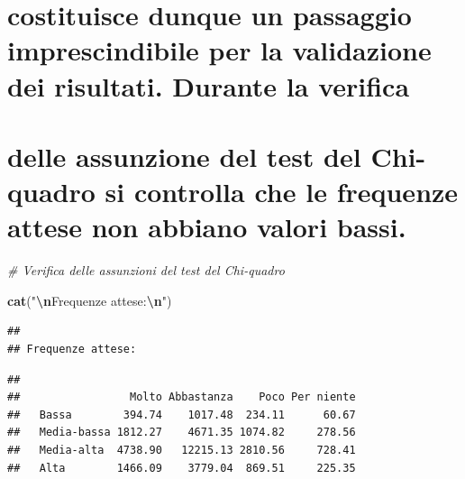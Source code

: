 \documentclass[
]{article}
\newenvironment{Shaded}{\begin{snugshade}}{\end{snugshade}}
\newcommand{\CommentTok}[1]{\textcolor[rgb]{0.56,0.35,0.01}{\textit{#1}}}
\newcommand{\DecValTok}[1]{\textcolor[rgb]{0.00,0.00,0.81}{#1}}
\newcommand{\FunctionTok}[1]{\textcolor[rgb]{0.13,0.29,0.53}{\textbf{#1}}}
\newcommand{\NormalTok}[1]{#1}
\newcommand{\OtherTok}[1]{\textcolor[rgb]{0.56,0.35,0.01}{#1}}
\newcommand{\SpecialCharTok}[1]{\textcolor[rgb]{0.81,0.36,0.00}{\textbf{#1}}}
\newcommand{\StringTok}[1]{\textcolor[rgb]{0.31,0.60,0.02}{#1}}
\begin{document}
\section{costituisce dunque un passaggio imprescindibile per la
validazione dei risultati. Durante la
verifica}\label{costituisce-dunque-un-passaggio-imprescindibile-per-la-validazione-dei-risultati.-durante-la-verifica}

\section{delle assunzione del test del Chi-quadro si controlla che le
frequenze attese non abbiano valori
bassi.}\label{delle-assunzione-del-test-del-chi-quadro-si-controlla-che-le-frequenze-attese-non-abbiano-valori-bassi.}

\begin{Shaded}
\begin{Highlighting}[]
\CommentTok{\# Verifica delle assunzioni del test del Chi{-}quadro}

\FunctionTok{cat}\NormalTok{(}\StringTok{"}\SpecialCharTok{\textbackslash{}n}\StringTok{Frequenze attese:}\SpecialCharTok{\textbackslash{}n}\StringTok{"}\NormalTok{)}
\end{Highlighting}
\end{Shaded}

\begin{verbatim}
## 
## Frequenze attese:
\end{verbatim}

\begin{Shaded}
\end{Shaded}

\begin{verbatim}
##              
##                 Molto Abbastanza    Poco Per niente
##   Bassa        394.74    1017.48  234.11      60.67
##   Media-bassa 1812.27    4671.35 1074.82     278.56
##   Media-alta  4738.90   12215.13 2810.56     728.41
##   Alta        1466.09    3779.04  869.51     225.35
\end{verbatim}

\begin{Shaded}
\end{Shaded}
\end{document}

